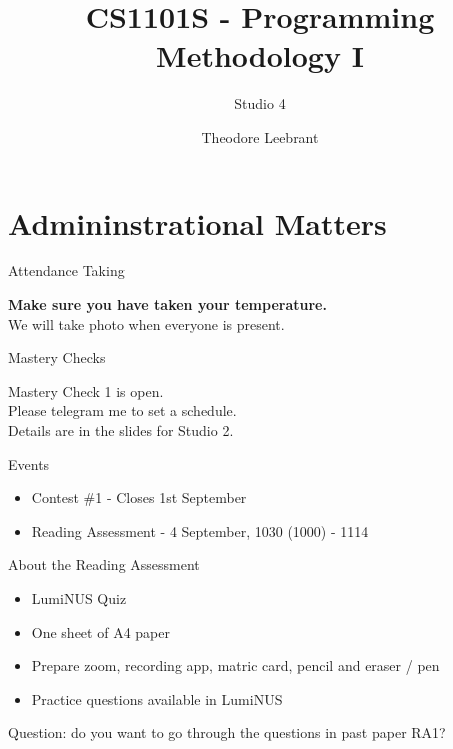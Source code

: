 \documentclass[10pt]{beamer}
\title{CS1101S - Programming Methodology I}
\subtitle{Studio 4}
\date{}
\author{Theodore Leebrant}
\institute{Tutorial Group 8D}
\begin{document}
\maketitle

\section[Admin Stuff]{Admininstrational Matters}

\begin{frame}[fragile]{Attendance Taking}
\begin{centering}
\textbf{Make sure you have taken your temperature.} \\
We will take photo when everyone is present. \\
\end{centering}
\end{frame}

\begin{frame}[fragile]{Mastery Checks}
\begin{centering}
Mastery Check 1 is open. \\
Please telegram me to set a schedule. \\
Details are in the slides for Studio 2. \\
\end{centering}
\end{frame}

\begin{frame}[fragile]{Events}
\begin{itemize}
  \item Contest \#1 - Closes 1st September
  \item Reading Assessment - 4 September, 1030 (1000) - 1114
\end{itemize}
\end{frame}

\begin{frame}[fragile]{About the Reading Assessment}
\begin{itemize}
  \item LumiNUS Quiz
  \item One sheet of A4 paper
  \item Prepare zoom, recording app, matric card, pencil and eraser / pen
  \item Practice questions available in LumiNUS
\end{itemize}
Question: do you want to go through the questions in past paper RA1? 
\end{frame}
\end{document}
